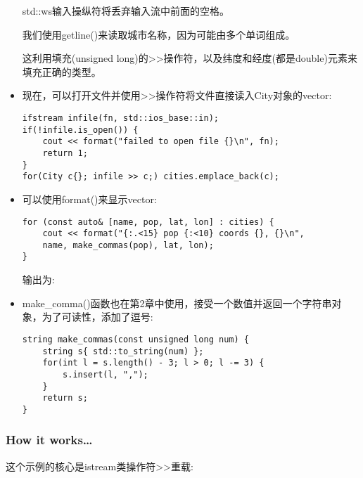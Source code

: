 \begin{itemize}
std::ws输入操纵符将丢弃输入流中前面的空格。

我们使用getline()来读取城市名称，因为可能由多个单词组成。

这利用填充(unsigned long)的>{}>操作符，以及纬度和经度(都是double)元素来填充正确的类型。

\item 
现在，可以打开文件并使用>{}>操作符将文件直接读入City对象的vector:

\begin{lstlisting}[style=styleCXX]
ifstream infile(fn, std::ios_base::in);
if(!infile.is_open()) {
	cout << format("failed to open file {}\n", fn);
	return 1;
}
for(City c{}; infile >> c;) cities.emplace_back(c);
\end{lstlisting}

\item 
可以使用format()来显示vector:

\begin{lstlisting}[style=styleCXX]
for (const auto& [name, pop, lat, lon] : cities) {
	cout << format("{:.<15} pop {:<10} coords {}, {}\n",
	name, make_commas(pop), lat, lon);
}
\end{lstlisting}

输出为:


\item 
make\_comma()函数也在第2章中使用，接受一个数值并返回一个字符串对象，为了可读性，添加了逗号:

\begin{lstlisting}[style=styleCXX]
string make_commas(const unsigned long num) {
	string s{ std::to_string(num) };
	for(int l = s.length() - 3; l > 0; l -= 3) {
		s.insert(l, ",");
	}
	return s;
}
\end{lstlisting}
\end{itemize}

\subsubsection{How it works…}

这个示例的核心是istream类操作符>{}>重载:

